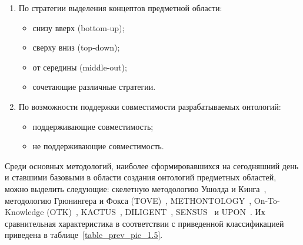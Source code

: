 \begin{enumerate}
  \item {По стратегии выделения концептов предметной области:
    \begin{itemize}
        \item снизу вверх (bottom-up);
        \item сверху вниз (top-down); 
        \item от середины (middle-out); 
        \item сочетающие различные стратегии.
    \end{itemize}
  }
  
  \item {По возможности поддержки совместимости разрабатываемых онтологий:
    \begin{itemize}
        \item поддерживающие совместимость;
        \item не поддерживающие совместимость.
    \end{itemize}
  }
\end{enumerate}

Среди основных методологий, наиболее сформировавшихся на сегодняшний день и ставшими базовыми в области создания онтологий предметных областей, можно выделить следующие: скелетную методологию Ушолда и Кинга~\cite{Uschold1996}, методологию Грюнингера и Фокса (TOVE)~\cite{Gruninger1995}, METHONTOLOGY~\cite{Gomez1996, Gomez2009}, On-To-Knowledge (OTK)~\cite{OntoEdit2002}, KACTUS~\cite{Bernaras1976}, DILIGENT~\cite{Pinto2004}, SENSUS~\cite{Swartout1997} и UPON~\cite{Nicola1997}. Их сравнительная характеристика в соответствии с приведенной классификацией приведена в \mbox{таблице \ref{table_prev_pic_1.5}.}


